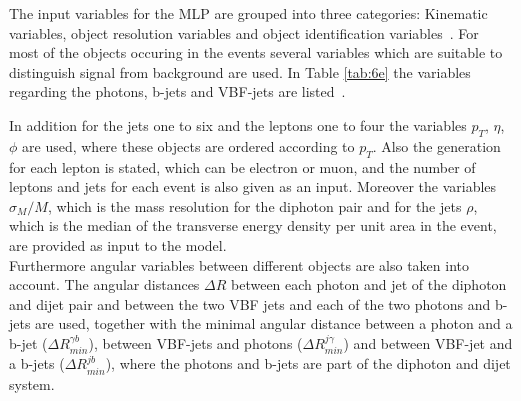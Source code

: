 The input variables for the MLP are grouped into three
categories: Kinematic variables, object resolution variables and object identification variables~\cite{CMS:2021qbp}.
For most of the objects occuring in the events several variables which are suitable to distinguish signal from background are used.
In Table \ref{tab:6e} the variables regarding the photons, b-jets and VBF-jets are listed~\cite{Run2analysisnote}.



In addition for the jets one to six and the leptons one to four the variables $p_T$, $\eta$, $\phi$ are used, where these objects are ordered according to $p_T$. Also the generation for each lepton is stated, which can be electron or muon,
and the number of leptons and jets for each event is
also given as an input. Moreover the variables $\sigma_M/M$, which is the mass resolution for the diphoton pair and for the jets $\rho$, which is the median of the transverse energy density per unit area in the event, are provided as input to the model. \\

Furthermore angular variables between different objects are also taken into account. The angular distances $\Delta R$ between each photon and jet of the diphoton and dijet pair 
and between the two VBF jets and each of the two photons and b-jets are used, together with the minimal angular distance between a photon and a b-jet ($\Delta R_{min}^{\gamma b}$), between VBF-jets and photons
($\Delta R_{min}^{j \gamma}$) and between VBF-jet and a b-jets ($\Delta R_{min}^{j b}$), where the photons and b-jets are part of the diphoton and dijet system. 

